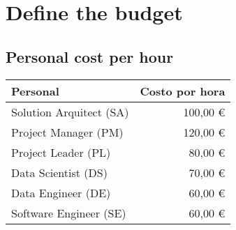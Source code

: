 \section{Define the budget}\label{sec:define-the-budget}

\subsection{Personal cost per hour}\label{subsec:personal-cost-per-hour}

\begin{tabular}{| >{\raggedright\arraybackslash}p{8cm} | r|}
    \hline
    Personal                & Costo por hora \\ \hline \hline
    Solution Arquitect (SA) & 100,00 \euro   \\ \hline
    Project Manager (PM)    & 120,00 \euro   \\ \hline
    Project Leader (PL)     & 80,00 \euro    \\ \hline
    Data Scientist (DS)     & 70,00 \euro    \\ \hline
    Data Engineer (DE)      & 60,00 \euro    \\ \hline
    Software Engineer (SE)  & 60,00 \euro    \\ \hline

\end{tabular}

